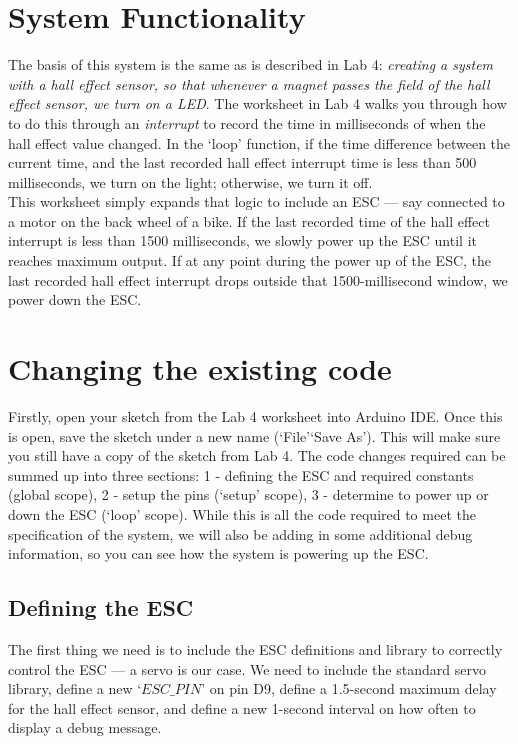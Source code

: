 \documentclass[11pt,a4paper]{article}
\begin{document}
\section{System Functionality}
\label{sec:functionality}
The basis of this system is the same as is described in Lab 4: \textit{creating a system with a hall effect sensor, so that whenever a magnet passes the field of the hall effect sensor, we turn on a LED}. The worksheet in Lab 4 walks you through how to do this through an \textit{interrupt} to record the time in milliseconds of when the hall effect value changed. In the `loop' function, if the time difference between the current time, and the last recorded hall effect interrupt time is less than 500 milliseconds, we turn on the light; otherwise, we turn it off.\\

\noindent
This worksheet simply expands that logic to include an ESC --- say connected to a motor on the back wheel of a bike. If the last recorded time of the hall effect interrupt is less than 1500 milliseconds, we slowly power up the ESC until it reaches maximum output. If at any point during the power up of the ESC, the last recorded hall effect interrupt drops outside that 1500-millisecond window, we power down the ESC.

\section{Changing the existing code}
Firstly, open your sketch from the Lab 4 worksheet into Arduino IDE. Once this is open, save the sketch under a new name (`File'\textrightarrow `Save As'). This will make sure you still have a copy of the sketch from Lab 4. The code changes required can be summed up into three sections: 1 - defining the ESC and required constants (global scope), 2 - setup the pins (`setup' scope), 3 - determine to power up or down the ESC (`loop' scope). While this is all the code required to meet the specification of the system, we will also be adding in some additional debug information, so you can see how the system is powering up the ESC.

\subsection{Defining the ESC}
The first thing we need is to include the ESC definitions and library to correctly control the ESC --- a servo is our case. We need to include the standard servo library, define a new `$ESC\_PIN$' on pin D9, define a 1.5-second maximum delay for the hall effect sensor, and define a new 1-second interval on how often to display a debug message.\\
\vspace{-1.75em}
\inputminted{arduino}{./src/1-define.txt}
\vspace{.75em}
\end{document}
